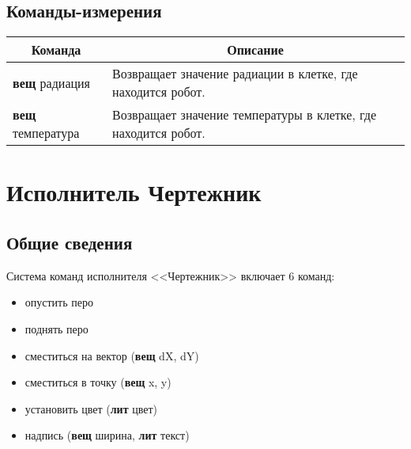 \documentclass[12pt,a4paper]{article}
\begin{document}
\subsection{Команды-измерения}
\begin{center}
\begin{tabular}{||p{3.5cm}|p{12.5cm}||}
\hline
\hline
\multicolumn{1}{||c|}{\bfseries Команда} & \multicolumn{1}{|c||}{\bfseries Описание}\\
\hline
	\textbf{вещ} радиация &
	Возвращает значение радиации в клетке, где находится робот.\\
	\textbf{вещ} температура &
	Возвращает значение температуры в клетке, где находится робот. \\
\hline
\hline
\end{tabular}
\end{center}

\section{Исполнитель Чертежник}

\subsection{Общие сведения}

Система команд исполнителя <<Чертежник>> включает 6 команд:
\begin{itemize}
\item	опустить перо
\item	поднять перо
\item	сместиться на вектор (\textbf{вещ} dX, dY)
\item	сместиться в точку (\textbf{вещ} x, y)
\item	установить цвет (\textbf{лит} цвет)
\item   надпись (\textbf{вещ} ширина, \textbf{лит} текст)
\end{itemize}
\end{document}
